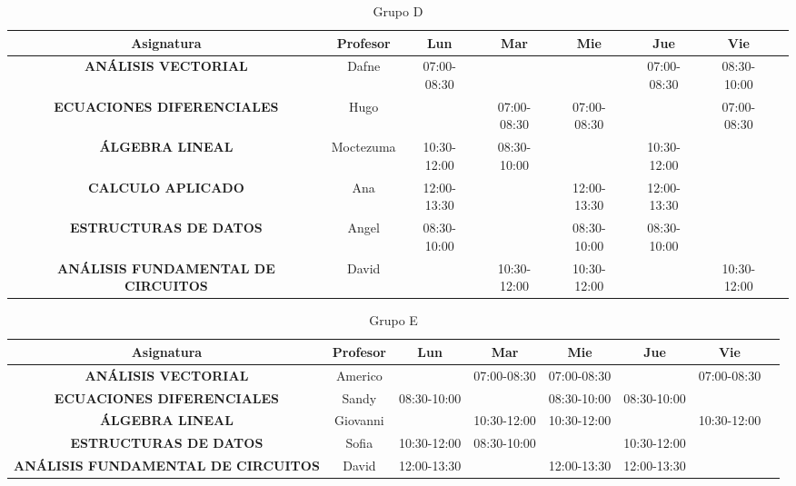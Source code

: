 \documentclass[10pt,letterpaper,twoside,openright]{article}
\begin{document}
	\begin{table}[h!]
		\centering
		\begin{adjustbox}{max width=\textwidth}
		\begin{tabular}{c||ccccccc}
		\textbf{Asignatura}                        & \textbf{Profesor} & \textbf{Lun} & \textbf{Mar} & \textbf{Mie} & \textbf{Jue} & \textbf{Vie} \\ \hline \hline
		\textbf{ANÁLISIS VECTORIAL}                & Dafne     & 07:00-08:30 &             &             & 07:00-08:30 & 08:30-10:00 \\
		\textbf{ECUACIONES DIFERENCIALES}          & Hugo      &             & 07:00-08:30 & 07:00-08:30 &             & 07:00-08:30 \\
		\textbf{ÁLGEBRA LINEAL}                    & Moctezuma & 10:30-12:00 & 08:30-10:00 &             & 10:30-12:00 &             \\
		\textbf{CALCULO APLICADO}                  & Ana       & 12:00-13:30 &             & 12:00-13:30 & 12:00-13:30 &             \\
		\textbf{ESTRUCTURAS DE DATOS}              & Angel     & 08:30-10:00 &             & 08:30-10:00 & 08:30-10:00 &             \\
		\textbf{ANÁLISIS FUNDAMENTAL DE CIRCUITOS} & David     &             & 10:30-12:00 & 10:30-12:00 &             & 10:30-12:00
		\end{tabular}
		\end{adjustbox}
		\caption{Grupo D}
		\label{tab:grupo_d}
	\end{table}

	\begin{table}[h!]
		\centering
		\begin{adjustbox}{max width=\textwidth}
		\begin{tabular}{c||ccccccc}
		\textbf{Asignatura}                        & \textbf{Profesor} & \textbf{Lun} & \textbf{Mar} & \textbf{Mie} & \textbf{Jue} & \textbf{Vie} \\ \hline \hline
		\textbf{ANÁLISIS VECTORIAL}                & Americo  &             & 07:00-08:30 & 07:00-08:30 &             & 07:00-08:30 \\
		\textbf{ECUACIONES DIFERENCIALES}          & Sandy    & 08:30-10:00 &             & 08:30-10:00 & 08:30-10:00 &             \\
		\textbf{ÁLGEBRA LINEAL}                    & Giovanni &             & 10:30-12:00 & 10:30-12:00 &             & 10:30-12:00 \\
		\textbf{ESTRUCTURAS DE DATOS}              & Sofia    & 10:30-12:00 & 08:30-10:00 &             & 10:30-12:00 &             \\
		\textbf{ANÁLISIS FUNDAMENTAL DE CIRCUITOS} & David    & 12:00-13:30 &             & 12:00-13:30 & 12:00-13:30 &            
		\end{tabular}
		\end{adjustbox}
		\caption{Grupo E}
		\label{tab:grupo_e}
	\end{table}
\end{document}
